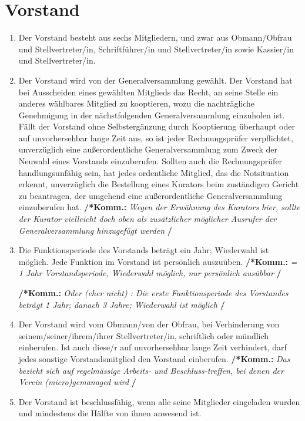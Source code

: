 \documentclass[a4paper,12pt]{article}
\newcommand{\comment}[1]{{\bf /*Komm.:} \textit{#1} {\bf */}}
\begin{document}
\section{Vorstand} %
\begin{enumerate}

\item Der Vorstand besteht aus sechs Mitgliedern, und zwar aus Obmann/Obfrau und Stellvertreter/in, Schriftführer/in und Stellvertreter/in sowie Kassier/in und Stellvertreter/in.

\item Der Vorstand wird von der Generalversammlung gewählt.
Der Vorstand hat bei Ausscheiden eines gewählten Mitglieds das Recht, an seine Stelle ein anderes wählbares Mitglied zu kooptieren, wozu die nachträgliche Genehmigung in der nächstfolgenden Generalversammlung einzuholen ist.
Fällt der Vorstand ohne Selbstergänzung durch Kooptierung überhaupt oder auf unvorhersehbar lange Zeit aus, so ist jeder Rechnungsprüfer verpflichtet, unverzüglich eine außerordentliche Generalversammlung zum Zweck der Neuwahl eines Vorstands einzuberufen.
Sollten auch die Rechnungsprüfer handlungsunfähig sein, hat jedes ordentliche Mitglied, das die Notsituation erkennt, unverzüglich die Bestellung eines Kurators beim zuständigen Gericht zu beantragen, der umgehend eine außerordentliche Generalversammlung einzuberufen hat.
\comment{Wegen der Erwähnung des Kurators hier, sollte der Kurator vielleicht doch oben als zusätzlicher möglicher Ausrufer der Generalversammlung hinzugefügt werden}

\item Die Funktionsperiode des Vorstands beträgt ein Jahr; Wiederwahl ist möglich.
Jede Funktion im Vorstand ist persönlich auszuüben.
\comment{ = 1 Jahr Vorstandsperiode, Wiederwahl möglich, nur persönlich ausübbar}

\comment{Oder (eher nicht) : Die erste Funktionsperiode des Vorstandes betr\"agt 1 Jahr; danach 3 Jahre; Wiederwahl ist m\"oglich}

\item Der Vorstand wird vom Obmann/von der Obfrau, bei Verhinderung von seinem/seiner/ihrem/ihrer Stellvertreter/in, schriftlich oder mündlich einberufen. Ist auch diese/r auf unvorhersehbar lange Zeit verhindert, darf jedes sonstige Vorstandsmitglied den Vorstand einberufen.
\comment{Das bezieht sich auf regelmässige Arbeits- und Beschluss-treffen, bei denen der Verein (micro)gemanaged wird}

\item Der Vorstand ist beschlussfähig, wenn alle seine Mitglieder eingeladen wurden und mindestens die Hälfte von ihnen anwesend ist.


\end{enumerate}
\end{document}
